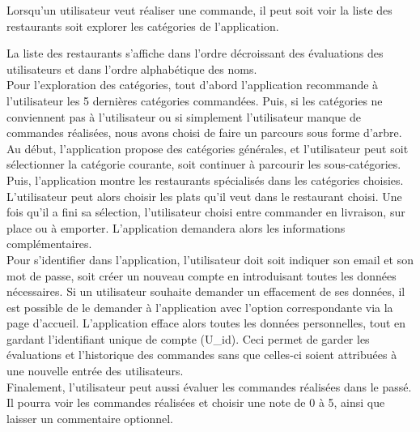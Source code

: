 \documentclass[10pt, a4paper]{article}
\begin{document}
Lorsqu'un utilisateur veut réaliser une commande, il peut soit voir la liste des restaurants soit explorer les catégories de l'application.

La liste des restaurants s'affiche dans l'ordre décroissant des évaluations des utilisateurs et dans l'ordre alphabétique des noms. \\

Pour l'exploration des catégories, tout d'abord l'application recommande à l'utilisateur les 5 dernières catégories
commandées. Puis, si les catégories ne conviennent pas à l'utilisateur ou si simplement l'utilisateur manque de commandes
réalisées, nous avons choisi de faire un parcours sous forme d'arbre. Au début, l'application propose des catégories générales, et
l'utilisateur peut soit sélectionner la catégorie courante, soit continuer à parcourir les sous-catégories. Puis, l'application montre
les restaurants spécialisés dans les catégories choisies. \\

L'utilisateur peut alors choisir les plats qu'il veut dans le restaurant choisi. Une fois qu'il a fini sa sélection, l'utilisateur
choisi entre commander en livraison, sur place ou à emporter. L'application demandera alors les informations complémentaires. \\

Pour s'identifier dans l'application, l'utilisateur doit soit indiquer son email et son mot de passe, soit créer un nouveau
compte en introduisant toutes les données nécessaires. Si un utilisateur souhaite demander un effacement de ses données,
il est possible de le demander à l'application avec l'option correspondante via la page d'accueil. L'application efface
alors toutes les données personnelles, tout en gardant l'identifiant unique de compte (U\_id). Ceci permet de garder les évaluations
et l'historique des commandes sans que celles-ci soient attribuées à une nouvelle entrée des utilisateurs. \\

Finalement, l'utilisateur peut aussi évaluer les commandes réalisées dans le passé. Il pourra voir les commandes réalisées
et choisir une note de 0 à 5, ainsi que laisser un commentaire optionnel.
\end{document}
